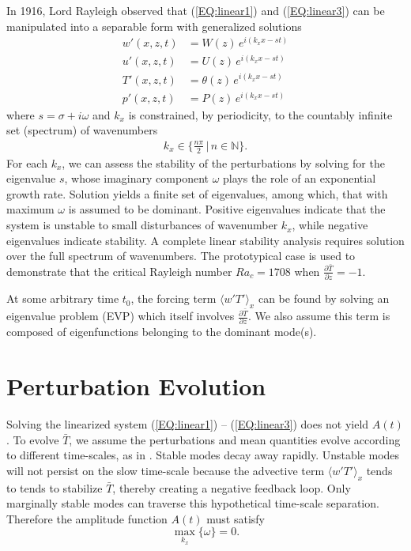 \documentclass[reprint,amsmath,amssymb,aps]{revtex4-1}
\begin{document}
In 1916, Lord Rayleigh observed that (\ref{EQ:linear1}) and (\ref{EQ:linear3}) can be manipulated into a separable form with generalized solutions
\begin{align}
    w'(x, z, t) &= W(z) \, e^{i(k_xx-st)} \label{EQ:normal_modes1}\\ 
    u'(x, z, t) &= U(z) \, e^{i(k_xx-st)} \label{EQ:normal_modes2}\\ 
    T'(x, z, t) &= \theta(z) \, e^{i(k_xx-st)} \label{EQ:normal_modes3}\\ 
    p'(x, z, t) &= P(z) \, e^{i(k_xx-st)}\label{EQ:normal_modes4}
\end{align}
where $s = \sigma + i\omega$ and $k_x$ is constrained, by periodicity, to the countably infinite set (spectrum) of wavenumbers
\begin{align}
    k_x \in \big\{\frac{n\pi}{2} \, \big| \, n \in \mathbb{N}\big\}.
\end{align}
For each $k_x$, we can assess the stability of the perturbations by solving for the eigenvalue $s$, whose imaginary component $\omega$ plays the role of an exponential growth rate. 
Solution yields a finite set of eigenvalues, among which, that with maximum $\omega$ is assumed to be dominant. 
Positive eigenvalues indicate that the system is unstable to small disturbances of wavenumber $k_x$, while negative eigenvalues indicate stability. 
A complete linear stability analysis requires solution over the full spectrum of wavenumbers. 
The prototypical case is used to demonstrate that the critical Rayleigh number $Ra_c = 1708$ when $\frac{\partial \bar{T}}{\partial z} = -1$.
 
At some arbitrary time $t_0$, the forcing term $\langle w'T' \rangle_x$ can be found by solving an eigenvalue problem (EVP) which itself involves $\frac{\partial \bar{T}}{\partial z}$. 
We also assume this term is composed of eigenfunctions belonging to the dominant mode(s). 

\section{Perturbation Evolution}
Solving the linearized system (\ref{EQ:linear1}) -- (\ref{EQ:linear3}) does not yield $A(t)$. 
To evolve $\bar{T}$, we assume the perturbations and mean quantities evolve according to different time-scales, as in \cite{michel_chini_2019}.
Stable modes decay away rapidly. 
Unstable modes will not persist on the slow time-scale because the advective term $\langle w'T' \rangle_x$ tends to tends to stabilize $\bar{T}$, thereby creating a negative feedback loop. Only marginally stable modes can traverse this hypothetical time-scale separation. Therefore the amplitude function $A(t)$ must satisfy
\begin{equation}
    \max_{k_x} \{ \omega \} = 0.
\end{equation}
\end{document}
